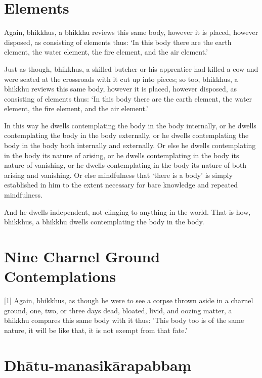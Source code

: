 
\englishPage
\section{Elements}

Again, bhikkhus, a bhikkhu reviews this same body, however it is placed, however
disposed, as consisting of elements thus: `In this body there are the earth
element, the water element, the fire element, and the air element.'

Just as though, bhikkhus, a skilled butcher or his apprentice had killed a cow
and were seated at the crossroads with it cut up into pieces; so too, bhikkhus,
a bhikkhu reviews this same body, however it is placed, however disposed, as
consisting of elements thus: `In this body there are the earth element, the
water element, the fire element, and the air element.'

In this way he dwells contemplating the body in the body internally, or he
dwells contemplating the body in the body externally, or he dwells contemplating
the body in the body both internally and externally. Or else he dwells
contemplating in the body its nature of arising, or he dwells contemplating in
the body its nature of vanishing, or he dwells contemplating in the body its
nature of both arising and vanishing. Or else mindfulness that ‘there is a body’
is simply established in him to the extent necessary for bare knowledge and
repeated mindfulness.

And he dwells independent, not clinging to anything in the world. That is how,
bhikkhus, a bhikkhu dwells contemplating the body in the body.


\section{Nine Charnel Ground Contemplations}

[1] Again, bhikkhus, as though he were to see a corpse thrown aside in a charnel
ground, one, two, or three days dead, bloated, livid, and oozing matter, a
bhikkhu compares this same body with it thus: 'This body too is of the same
nature, it will be like that, it is not exempt from that fate.'

\paliPage
\section*{Dhātu-manasikārapabbaṃ}

